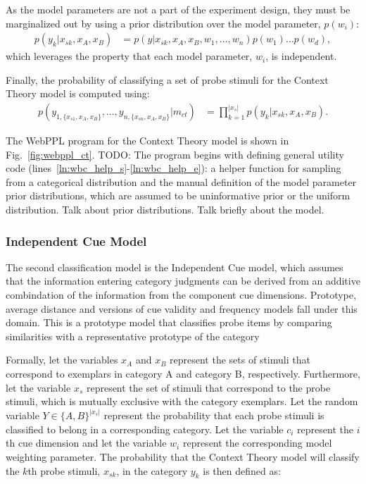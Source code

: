 \documentclass{article}
\begin{document}
As the model parameters are not a part of the experiment design, they must be marginalized out by using a prior distribution over the model parameter, $p(w_i)$:
\begin{align}
    p(y_k | x_{sk}, x_A, x_B) &=  p(y|x_{sk}, x_A, x_B ,w_1, \dots, w_n) p(w_1) \dots p(w_d),
\end{align}
which leverages the property that each model parameter, $w_i$, is independent.

Finally, the probability of classifying a set of probe stimuli for the Context Theory model is computed using: 
\begin{align}
    p(y_{1,\{x_{s1}, x_A, x_B\}}, \dots, y_{n,\{x_{sn}, x_A, x_B\}} | m_{ct}) &=  \prod\limits_{k=1}^{|x_s|} p(y_k|x_{sk}, x_A, x_B).
\end{align}

The WebPPL program for the Context Theory model is shown in Fig.~\ref{fig:webppl_ct}. TODO: The program begins with defining general utility code (lines~\ref{ln:wbc_help_s}-\ref{ln:wbc_help_e}): a helper function for sampling from a categorical distribution and the manual definition of the model parameter prior distributions, which are assumed to be uninformative prior or the uniform distribution. Talk about prior distributions. Talk briefly about the model. 


\subsubsection{Independent Cue Model}
The second classification model is the Independent Cue model, which assumes that the information entering category judgments can be derived from an additive combindation of the information from the component cue dimensions. Prototype, average distance and versions of cue validity and frequency models fall under this domain. This is a prototype model that classifies probe items by comparing similarities with a representative prototype of the category




Formally, let the variables $x_A$ and $x_B$ represent the sets of stimuli that correspond to exemplars in category A and category B, respectively. Furthermore, let the variable $x_s$ represent the set of stimuli that correspond to the probe stimuli, which is mutually exclusive with the category exemplars. Let the random variable $Y \in \{A,B\}^{|x_s|}$ represent the probability that each probe stimuli is classified to belong in a corresponding category. Let the variable $c_i$ represent the $i$th cue dimension and let the variable $w_i$ represent the corresponding model weighting parameter. The probability that the Context Theory model will classify the $k$th probe stimuli, $x_{sk}$, in the category $y_k$ is then defined as:
\end{document}
